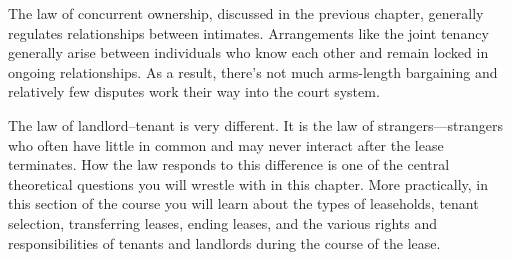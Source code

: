 The law of concurrent ownership, discussed in the previous chapter, generally
regulates relationships between intimates.  Arrangements like the joint tenancy
generally arise between individuals who know each other and remain locked in
ongoing relationships.  As a result, there's not much arms-length bargaining
and relatively few disputes work their way into the court system.

The law of landlord--tenant is very different.  It is the law of
strangers---strangers who often have little in common and may never interact
after the lease terminates.  How the law responds to this difference is one of
the central theoretical questions you will wrestle with in this chapter.  More
practically, in this section of the course you will learn about the types of
leaseholds, tenant selection, transferring leases, ending leases, and the
various rights and responsibilities of tenants and landlords during the course
of the lease.

